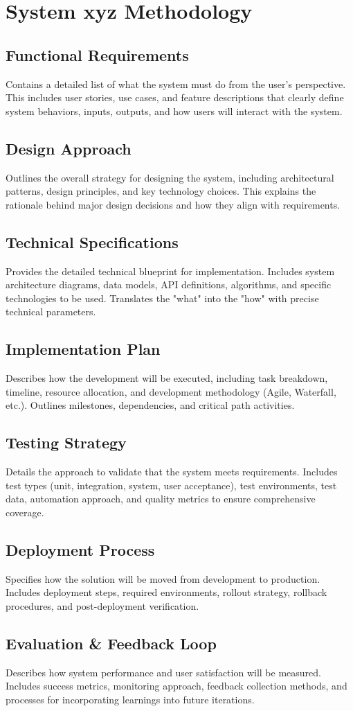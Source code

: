 \section{System xyz Methodology}

\subsection{Functional Requirements}
Contains a detailed list of what the system must do from the user's perspective. This includes user stories, use cases, and feature descriptions that clearly define system behaviors, inputs, outputs, and how users will interact with the system.
\subsection{Design Approach}
Outlines the overall strategy for designing the system, including architectural patterns, design principles, and key technology choices. This explains the rationale behind major design decisions and how they align with requirements.
\subsection{Technical Specifications}
Provides the detailed technical blueprint for implementation. Includes system architecture diagrams, data models, API definitions, algorithms, and specific technologies to be used. Translates the "what" into the "how" with precise technical parameters.
\subsection{Implementation Plan}
Describes how the development will be executed, including task breakdown, timeline, resource allocation, and development methodology (Agile, Waterfall, etc.). Outlines milestones, dependencies, and critical path activities.
\subsection{Testing Strategy}
Details the approach to validate that the system meets requirements. Includes test types (unit, integration, system, user acceptance), test environments, test data, automation approach, and quality metrics to ensure comprehensive coverage.
\subsection{Deployment Process}
Specifies how the solution will be moved from development to production. Includes deployment steps, required environments, rollout strategy, rollback procedures, and post-deployment verification.
\subsection{Evaluation & Feedback Loop}
Describes how system performance and user satisfaction will be measured. Includes success metrics, monitoring approach, feedback collection methods, and processes for incorporating learnings into future iterations.

